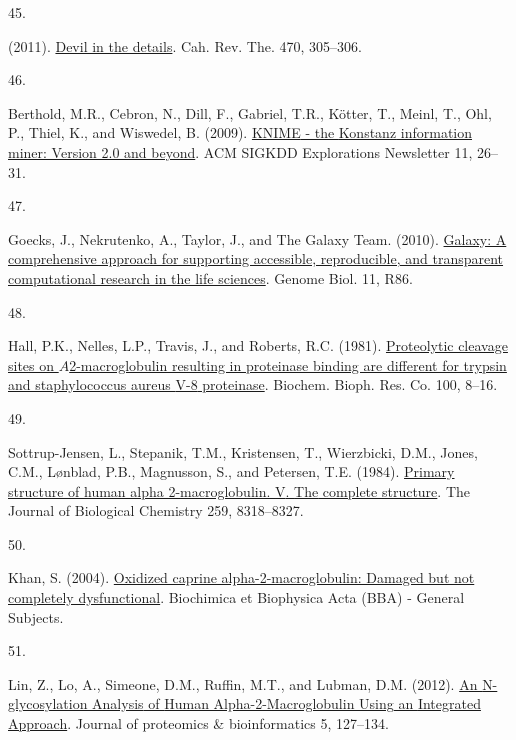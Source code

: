 \documentclass[
]{article}
\newlength{\cslhangindent}
\newlength{\csllabelwidth}
\newlength{\cslentryspacingunit} %
\newenvironment{CSLReferences}[2] %
 {%
  \setlength{\parindent}{0pt}
  \ifodd #1
  \let\oldpar\par
  \def\par{\hangindent=\cslhangindent\oldpar}
  \fi
  \setlength{\parskip}{#2\cslentryspacingunit}
 }%
 {}
\newcommand{\CSLLeftMargin}[1]{\parbox[t]{\csllabelwidth}{#1}}
\newcommand{\CSLRightInline}[1]{\parbox[t]{\linewidth - \csllabelwidth}{#1}\break}
\begin{document}
\begin{CSLReferences}{0}{0}
\leavevmode{}%
\CSLLeftMargin{45. }
\CSLRightInline{(2011). \href{https://doi.org/10.1038/470305b}{Devil in the details}. Cah. Rev. The. 470, 305--306.}

\leavevmode{}%
\CSLLeftMargin{46. }
\CSLRightInline{Berthold, M.R., Cebron, N., Dill, F., Gabriel, T.R., Kötter, T., Meinl, T., Ohl, P., Thiel, K., and Wiswedel, B. (2009). \href{https://doi.org/10.1145/1656274.1656280}{{KNIME} - the {Konstanz} information miner: Version 2.0 and beyond}. ACM SIGKDD Explorations Newsletter 11, 26--31.}

\leavevmode{}%
\CSLLeftMargin{47. }
\CSLRightInline{Goecks, J., Nekrutenko, A., Taylor, J., and The Galaxy Team. (2010). \href{https://doi.org/10.1186/gb-2010-11-8-r86}{Galaxy: A comprehensive approach for supporting accessible, reproducible, and transparent computational research in the life sciences}. Genome Biol. 11, R86.}

\leavevmode{}%
\CSLLeftMargin{48. }
\CSLRightInline{Hall, P.K., Nelles, L.P., Travis, J., and Roberts, R.C. (1981). \href{https://doi.org/10.1016/S0006-291X(81)80055-1}{Proteolytic cleavage sites on {\(A\)}2-macroglobulin resulting in proteinase binding are different for trypsin and staphylococcus aureus {V-8} proteinase}. Biochem. Bioph. Res. Co. 100, 8--16.}

\leavevmode{}%
\CSLLeftMargin{49. }
\CSLRightInline{Sottrup-Jensen, L., Stepanik, T.M., Kristensen, T., Wierzbicki, D.M., Jones, C.M., Lønblad, P.B., Magnusson, S., and Petersen, T.E. (1984). \href{https://www.ncbi.nlm.nih.gov/pubmed/6203908}{Primary structure of human alpha 2-macroglobulin. {V}. {The} complete structure}. The Journal of Biological Chemistry 259, 8318--8327.}

\leavevmode{}%
\CSLLeftMargin{50. }
\CSLRightInline{Khan, S. (2004). \href{https://doi.org/10.1016/j.bbagen.2004.06.008}{Oxidized caprine alpha-2-macroglobulin: Damaged but not completely dysfunctional}. Biochimica et Biophysica Acta (BBA) - General Subjects.}

\leavevmode{}%
\CSLLeftMargin{51. }
\CSLRightInline{Lin, Z., Lo, A., Simeone, D.M., Ruffin, M.T., and Lubman, D.M. (2012). \href{https://doi.org/10.4172/jpb.1000224}{An {N-glycosylation Analysis} of {Human Alpha-2-Macroglobulin Using} an {Integrated Approach}}. Journal of proteomics \& bioinformatics 5, 127--134.}


\end{CSLReferences}
\end{document}
